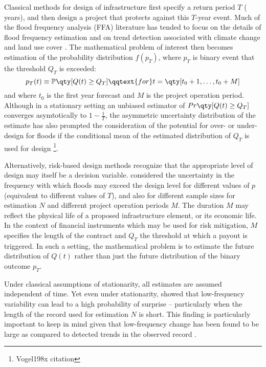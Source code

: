 \documentclass[11pt]{article}
\begin{document}
Classical methods for design of infrastructure first specify a return period $T$ ( years), and then design a project that protects against this $T$-year event.
Much of the flood frequency analysis (FFA) literature has tended to focus on the details of flood frequency estimation and on trend detection associated with climate change and land use cover \citep{Merz2008,Kidson2016,Merz2014}.
The mathematical problem of interest then becomes estimation of the probability distribution $f(p_T)$, where $p_T$ is binary event that the threshold $Q_T$ is exceeded:
\begin{equation*}
  p_T(t) \equiv \probability \qty[ Q(t) \geq Q_T] \qqtext{for} t = \qty[t_0 + 1, \ldots, t_0 + M]
\end{equation*}
and where $t_0$ is the first year forecast and $M$ is the project operation period.
Although in a stationary setting an unbiased estimator of $Pr \qty[ Q(t) \geq Q_T]$ converges asymtotically to $1 - \frac{1}{T}$, the asymmetric uncertainty distribution of the estimate has also prompted the consideration of the potential for over- or under-design for floods if the conditional mean of the estimated distribution of $Q_T$ is used for design \citep{Stedinger1997}\footnote{Vogel198x citation}.

Alternatively, risk-based design methods \citep[RBDM; see][]{Rosner2014} recognize that the appropriate level of design  may itself be a decision variable.
\citet{Lall1987} considered the uncertainty in the frequency with which floods may exceed the design level for different values of $p$ (equivalent to different values of $T$), and also for different sample sizes for estimation $N$ and different project operation periods $M$.
The duration $M$ may reflect the physical life of a proposed infrastructure element, or its economic life.
In the context of financial instruments which may be used for risk mitigation, $M$ specifies the length of the contract and $Q_T$ the threshold at which a payout is triggered.
In such a setting, the mathematical problem is to estimate the future distribution of $Q(t)$ rather than just the future distribution of the binary outcome $p_T$.

Under classical assumptions of stationarity, all estimates are assumed independent of time.
Yet even under stationarity, \citet{Jain2001} showed that low-frequency variability can lead to a high probability of surprise -- particularly when the length of the record used for estimation $N$ is short.
This finding is particularly important to keep in mind given that low-frequency change has been found to be large as compared to detected trends in the observed record \citep{Hodgkins2017}.
\end{document}
